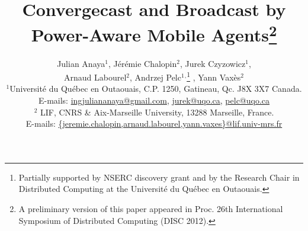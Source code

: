\documentclass{article}
\newcommand{\inst}[1]{$^{#1}$}
\begin{document}
\sloppy

\SetAlFnt{\small\tt}
\SetAlCapFnt{\tt}


\title{\bf {Convergecast and Broadcast by Power-Aware Mobile Agents\thanks{A preliminary version of this paper appeared in Proc. 26th International Symposium of Distributed Computing (DISC 2012).}}}






\author{
Julian Anaya\inst{1},
J\'{e}r\'{e}mie Chalopin\inst{2},
Jurek Czyzowicz\inst{1},\\
Arnaud Labourel\inst{2},
Andrzej Pelc\inst{1}$^,$\footnote{{Partially supported by NSERC discovery grant and by the Research Chair in Distributed Computing at the Universit\'e du Qu\'{e}bec en Outaouais.}} ,
Yann Vax\`es\inst{2}\\
\inst{1}Universit\'{e} du Qu\'{e}bec en Outaouais,
C.P. 1250, Gatineau, Qc. J8X 3X7
Canada.\\
E-mails: \url{ingjuliananaya@gmail.com},  \url{jurek@uqo.ca}, \url{pelc@uqo.ca}\\
\inst{2} LIF, CNRS \& Aix-Marseille University,
13288 Marseille, France.\\
E-mails: \url{{jeremie.chalopin,arnaud.labourel,yann.vaxes}@lif.univ-mrs.fr}
}


\maketitle
\end{document}
